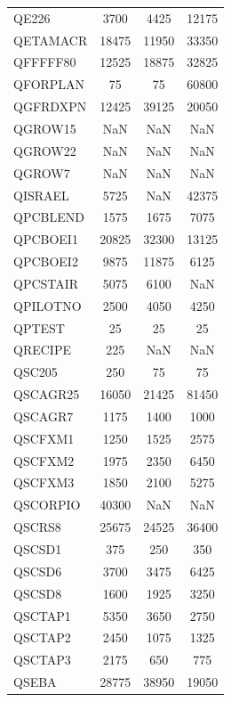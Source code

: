 \begin{longtable}{lccc}
QE226    &     3700 &     4425 &    12175 \\
QETAMACR &    18475 &    11950 &    33350 \\
QFFFFF80 &    12525 &    18875 &    32825 \\
QFORPLAN &       75 &       75 &    60800 \\
QGFRDXPN &    12425 &    39125 &    20050 \\
QGROW15  &      NaN &      NaN &      NaN \\
QGROW22  &      NaN &      NaN &      NaN \\
QGROW7   &      NaN &      NaN &      NaN \\
QISRAEL  &     5725 &      NaN &    42375 \\
QPCBLEND &     1575 &     1675 &     7075 \\
QPCBOEI1 &    20825 &    32300 &    13125 \\
QPCBOEI2 &     9875 &    11875 &     6125 \\
QPCSTAIR &     5075 &     6100 &      NaN \\
QPILOTNO &     2500 &     4050 &     4250 \\
QPTEST   &       25 &       25 &       25 \\
QRECIPE  &      225 &      NaN &      NaN \\
QSC205   &      250 &       75 &       75 \\
QSCAGR25 &    16050 &    21425 &    81450 \\
QSCAGR7  &     1175 &     1400 &     1000 \\
QSCFXM1  &     1250 &     1525 &     2575 \\
QSCFXM2  &     1975 &     2350 &     6450 \\
QSCFXM3  &     1850 &     2100 &     5275 \\
QSCORPIO &    40300 &      NaN &      NaN \\
QSCRS8   &    25675 &    24525 &    36400 \\
QSCSD1   &      375 &      250 &      350 \\
QSCSD6   &     3700 &     3475 &     6425 \\
QSCSD8   &     1600 &     1925 &     3250 \\
QSCTAP1  &     5350 &     3650 &     2750 \\
QSCTAP2  &     2450 &     1075 &     1325 \\
QSCTAP3  &     2175 &      650 &      775 \\
QSEBA    &    28775 &    38950 &    19050 \\

\end{longtable}

